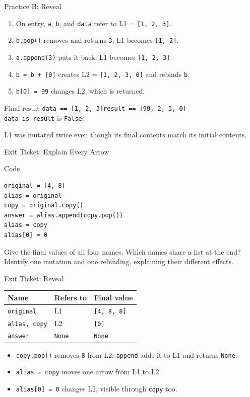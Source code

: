 \documentclass[aspectratio=169,10pt]{beamer}
\begin{document}
\begin{frame}{Practice B: Reveal}
  \begin{enumerate}
    \item On entry, \texttt{a}, \texttt{b}, and \texttt{data} refer to L1 = \texttt{[1, 2, 3]}.
    \item \texttt{b.pop()} removes and returns \texttt{3}; L1 becomes \texttt{[1, 2]}.
    \item \texttt{a.append(3)} puts it back; L1 becomes \texttt{[1, 2, 3]}.
    \item \texttt{b = b + [0]} creates L2 = \texttt{[1, 2, 3, 0]} and rebinds \texttt{b}.
    \item \texttt{b[0] = 99} changes L2, which is returned.
  \end{enumerate}
  \begin{block}{Final result}
    \texttt{data == [1, 2, 3]}\qquad \texttt{result == [99, 2, 3, 0]}\\
    \texttt{data is result} is \texttt{False}.
  \end{block}
  L1 was mutated twice even though its final contents match its initial contents.
\end{frame}

\begin{frame}[fragile]{Exit Ticket: Explain Every Arrow}
  \begin{block}{Code}
\begin{verbatim}
original = [4, 8]
alias = original
copy = original.copy()
answer = alias.append(copy.pop())
alias = copy
alias[0] = 0
\end{verbatim}
  \end{block}
  \begin{activity}
    Give the final values of all four names. Which names share a list at the end? Identify one mutation and one rebinding, explaining their different effects.
  \end{activity}
\end{frame}

\begin{frame}{Exit Ticket: Reveal}
  \begin{center}
    \renewcommand{\arraystretch}{1.4}
    \begin{tabular}{l|l|l}
      \textbf{Name} & \textbf{Refers to} & \textbf{Final value} \\\hline
      \texttt{original} & L1 & \texttt{[4, 8, 8]} \\
      \texttt{alias, copy} & L2 & \texttt{[0]} \\
      \texttt{answer} & \texttt{None} & \texttt{None}
    \end{tabular}
  \end{center}
  \begin{itemize}
    \item \texttt{copy.pop()} removes \texttt{8} from L2; \texttt{append} adds it to L1 and returns \texttt{None}.
    \item \texttt{alias = copy} moves one arrow from L1 to L2.
    \item \texttt{alias[0] = 0} changes L2, visible through \texttt{copy} too.
  \end{itemize}
\end{frame}
\end{document}
